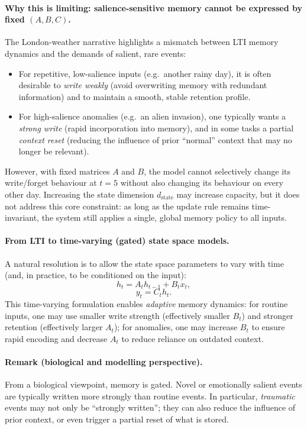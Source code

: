 \documentclass[a4paper,11pt]{article}
\begin{document}
\paragraph{Why this is limiting: salience-sensitive memory cannot be expressed by fixed $(A,B,C)$.}
The London-weather narrative highlights a mismatch between LTI memory dynamics and the demands of salient, rare events:
\begin{itemize}
    \item For repetitive, low-salience inputs (e.g.\ another rainy day), it is often desirable to \emph{write weakly} (avoid overwriting memory with redundant information) and to maintain a smooth, stable retention profile.
    \item For high-salience anomalies (e.g.\ an alien invasion), one typically wants a \emph{strong write} (rapid incorporation into memory), and in some tasks a partial \emph{context reset} (reducing the influence of prior ``normal'' context that may no longer be relevant).
\end{itemize}
However, with fixed matrices $A$ and $B$, the model cannot selectively change its write/forget behaviour at $t=5$ without also changing its behaviour on every other day. Increasing the state dimension $d_{\text{state}}$ may increase capacity, but it does not address this core constraint: as long as the update rule remains time-invariant, the system still applies a single, global memory policy to all inputs.

\paragraph{From LTI to time-varying (gated) state space models.}
A natural resolution is to allow the state space parameters to vary with time (and, in practice, to be conditioned on the input):
\begin{equation}
    h_t = A_t h_{t-1} + B_t x_t,
    \label{eq:tv_update}
\end{equation}
\begin{equation}
    y_t = C_t h_t.
    \label{eq:tv_readout}
\end{equation}
This time-varying formulation enables \emph{adaptive} memory dynamics: for routine inputs, one may use smaller write strength (effectively smaller $B_t$) and stronger retention (effectively larger $A_t$); for anomalies, one may increase $B_t$ to ensure rapid encoding and decrease $A_t$ to reduce reliance on outdated context.


\paragraph{Remark (biological and modelling perspective).}
From a biological viewpoint, memory is gated. Novel or emotionally salient events are typically written more strongly than routine events. In particular, \emph{traumatic} events may not only be ``strongly written''; they can also reduce the influence of prior context, or even trigger a partial reset of what is stored. 
\end{document}
